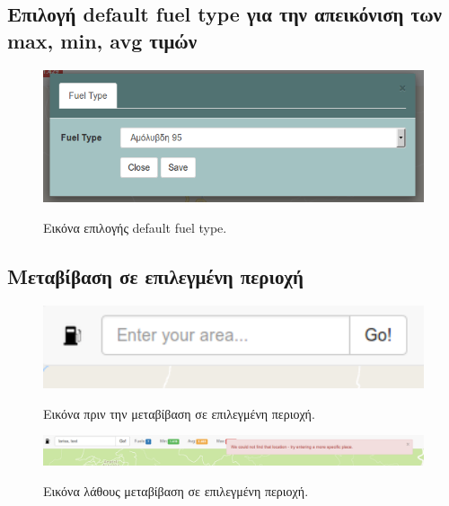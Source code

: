 \subsection{Επιλογή default fuel type για την απεικόνιση των max, min, avg τιμών}

\begin{figure}[H]
  \caption{Εικόνα επιλογής default fuel type.}
  \centering
    \includegraphics[width=1\textwidth]{img/fuel-type.png}
    \label{fig:fuel-type}
\end{figure}

\subsection{Μεταβίβαση σε επιλεγμένη περιοχή}

\begin{figure}[H]
  \caption{Εικόνα πριν την μεταβίβαση σε επιλεγμένη περιοχή.}
  \centering
    \includegraphics[width=1\textwidth]{img/pre-area.png}
    \label{fig:pre-area}
\end{figure}

\begin{figure}[H]
  \caption{Εικόνα λάθους μεταβίβαση σε επιλεγμένη περιοχή.}
  \centering
    \includegraphics[width=1\textwidth]{img/area-error.png}
    \label{fig:arrea-error}
\end{figure}

